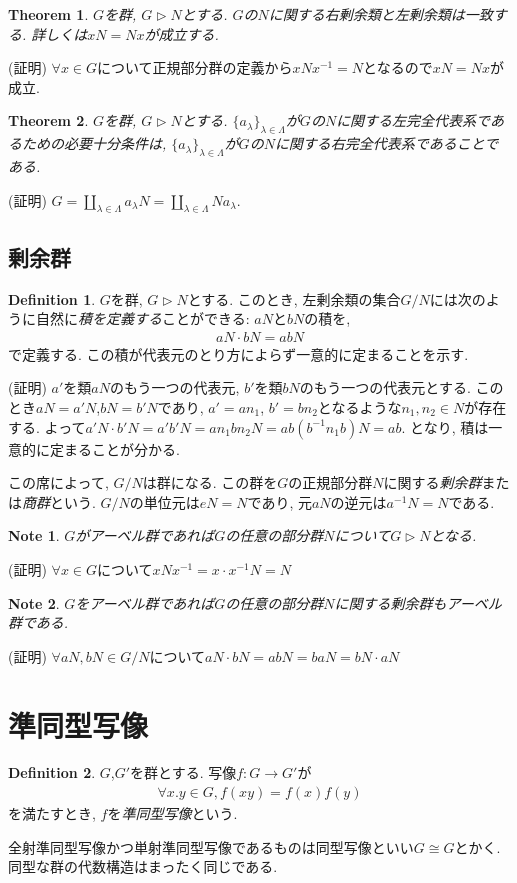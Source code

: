 \documentclass{article}
\theoremstyle{plain}
\newtheorem{theorem}{Theorem}
\theoremstyle{definition}
\newtheorem{definition}{Definition}
\theoremstyle{plain}
\newtheorem{note}{Note}
\numberwithin{equation}{section}
\numberwithin{theorem}{section}
\numberwithin{definition}{section}
\numberwithin{note}{section}
\begin{document}
\begin{theorem}
     $G$を群, $G\rhd N$とする. $G$の$N$に関する右剰余類と左剰余類は一致する. 
     詳しくは$xN=Nx$が成立する.
\end{theorem}
(証明) $\forall x\in G$について正規部分群の定義から$xNx^{-1}=N$となるので$xN=Nx$が成立.

\begin{theorem}
     $G$を群, $G\rhd N$とする. $\lbrace a_\lambda\rbrace_{\lambda\in \Lambda}$が$G$の$N$に関する左完全代表系であるための必要十分条件は, $\lbrace a_\lambda\rbrace_{\lambda\in \Lambda}$が$G$の$N$に関する右完全代表系であることである.
\end{theorem}
(証明) $G=\coprod_{\lambda\in \Lambda}a_\lambda N=\coprod_{\lambda\in \Lambda}N a_\lambda$.
\subsection{剰余群}
\begin{definition}
     $G$を群, $G\rhd N$とする. このとき, 左剰余類の集合$G/N$には次のように自然に\emph{積を定義する}ことができる: $aN$と$bN$の積を,
     \begin{align}
          aN\cdot bN=abN
     \end{align}
     で定義する. この積が代表元のとり方によらず一意的に定まることを示す.

     (証明) $a'$を類$aN$のもう一つの代表元, $b'$を類$bN$のもう一つの代表元とする.
     このとき$aN=a'N$,$bN=b'N$であり, $a'=an_1$, $b'=bn_2$となるような$n_1,n_2\in N$が存在する.
     よって$a'N\cdot b'N=a'b'N=an_1bn_2N=ab(b^{-1}n_1b)N=ab$. となり, 積は一意的に定まることが分かる.

     この席によって, $G/N$は群になる. この群を$G$の正規部分群$N$に関する\emph{剰余群}または\emph{商群}という. $G/N$の単位元は$eN=N$であり, 元$aN$の逆元は$a^{-1}N=N$である. 
\end{definition}
\begin{note}
     $G$がアーベル群であれば$G$の任意の部分群$N$について$G\rhd N$となる.
\end{note}
(証明) $\forall x \in G$について$xNx^{-1}=x\cdot x^{-1}N=N$
\begin{note}
     $G$をアーベル群であれば$G$の任意の部分群$N$に関する剰余群もアーベル群である.
\end{note}
(証明) $\forall aN,bN\in G/N$について$aN\cdot b N=ab N=baN=bN\cdot aN$
\section{準同型写像}
\begin{definition}
     $G$,$G'$を群とする. 写像$f\colon G\to G'$が
     \begin{align}
          \forall x.y\in G, f(xy)=f(x)f(y)
     \end{align} 
     を満たすとき, $f$を\emph{準同型写像}という.
\end{definition}
全射準同型写像かつ単射準同型写像であるものは同型写像といい$G\cong G$とかく. 同型な群の代数構造はまったく同じである.
\end{document}
